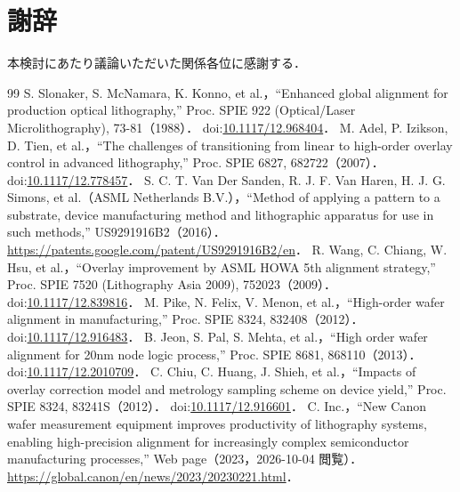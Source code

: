 \documentclass[10.5pt,a4paper]{ltjsarticle}
\begin{document}
\section*{謝辞}

本検討にあたり議論いただいた関係各位に感謝する．

\begin{thebibliography}{99}
\small
{} S. Slonaker, S. McNamara, K. Konno, et al.，``Enhanced global alignment for production optical lithography,'' Proc. SPIE 922 (Optical/Laser Microlithography), 73-81（1988）． doi:\href{https://doi.org/10.1117/12.968404}{10.1117/12.968404}．
 M. Adel, P. Izikson, D. Tien, et al.，``The challenges of transitioning from linear to high-order overlay control in advanced lithography,'' Proc. SPIE 6827, 682722（2007）． doi:\href{https://doi.org/10.1117/12.778457}{10.1117/12.778457}．
 S. C. T. Van Der Sanden, R. J. F. Van Haren, H. J. G. Simons, et al.（ASML Netherlands B.V.），``Method of applying a pattern to a substrate, device manufacturing method and lithographic apparatus for use in such methods,'' US9291916B2（2016）． \url{https://patents.google.com/patent/US9291916B2/en}．
 R. Wang, C. Chiang, W. Hsu, et al.，``Overlay improvement by ASML HOWA 5th alignment strategy,'' Proc. SPIE 7520 (Lithography Asia 2009), 752023（2009）． doi:\href{https://doi.org/10.1117/12.839816}{10.1117/12.839816}．
 M. Pike, N. Felix, V. Menon, et al.，``High-order wafer alignment in manufacturing,'' Proc. SPIE 8324, 832408（2012）． doi:\href{https://doi.org/10.1117/12.916483}{10.1117/12.916483}．
 B. Jeon, S. Pal, S. Mehta, et al.，``High order wafer alignment for 20nm node logic process,'' Proc. SPIE 8681, 868110（2013）． doi:\href{https://doi.org/10.1117/12.2010709}{10.1117/12.2010709}．
 C. Chiu, C. Huang, J. Shieh, et al.，``Impacts of overlay correction model and metrology sampling scheme on device yield,'' Proc. SPIE 8324, 83241S（2012）． doi:\href{https://doi.org/10.1117/12.916601}{10.1117/12.916601}．
 C. Inc.，``New Canon wafer measurement equipment improves productivity of lithography systems, enabling high-precision alignment for increasingly complex semiconductor manufacturing processes,'' Web page（2023，2026-10-04 閲覧）． \url{https://global.canon/en/news/2023/20230221.html}．

\end{thebibliography}
\end{document}
